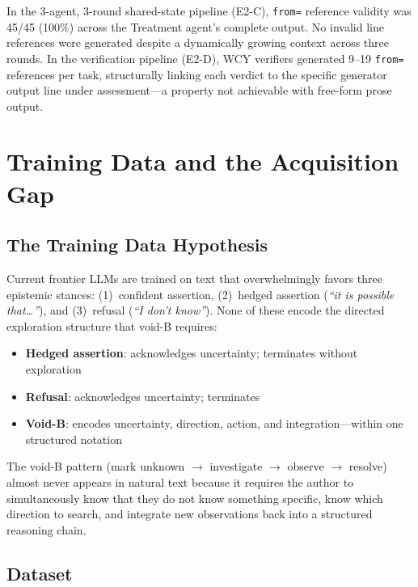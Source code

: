 \documentclass[11pt,a4paper]{article}
\begin{document}
In the 3-agent, 3-round shared-state pipeline (E2-C), \texttt{from=} reference validity was 45/45 (100\%) across the Treatment agent's complete output. No invalid line references were generated despite a dynamically growing context across three rounds. In the verification pipeline (E2-D), WCY verifiers generated 9--19 \texttt{from=} references per task, structurally linking each verdict to the specific generator output line under assessment---a property not achievable with free-form prose output.

\section{Training Data and the Acquisition Gap}
\label{sec:data}

\subsection{The Training Data Hypothesis}

Current frontier LLMs are trained on text that overwhelmingly favors three epistemic stances: (1)~confident assertion, (2)~hedged assertion (\emph{``it is possible that\ldots''}), and (3)~refusal (\emph{``I don't know''}). None of these encode the directed exploration structure that void-B requires:

\begin{itemize}[leftmargin=*,itemsep=2pt]
  \item \textbf{Hedged assertion}: acknowledges uncertainty; terminates without exploration
  \item \textbf{Refusal}: acknowledges uncertainty; terminates
  \item \textbf{Void-B}: encodes uncertainty, direction, action, and integration---within one structured notation
\end{itemize}

The void-B pattern (mark unknown $\to$ investigate $\to$ observe $\to$ resolve) almost never appears in natural text because it requires the author to simultaneously know that they do not know something specific, know which direction to search, and integrate new observations back into a structured reasoning chain.

\subsection{Dataset}
\end{document}
